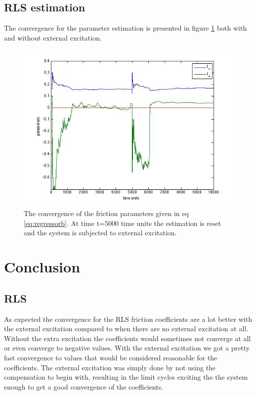 \documentclass[10pt,a4paper]{article}
\begin{document}
\subsection{RLS estimation}
The convergence for the parameter estimation is presented in figure \ref{fig:rlsconv} both with and without external excitation.
\begin{figure}[H]
\centering
\includegraphics[scale=0.7]{plots/rlsconvergence.jpg}
\caption{The convergence of the friction parameters given in eq \ref{eq:regressorb}. At time t=5000 time units the estimation is reset and the system is subjected to external excitation.}
\label{fig:rlsconv}

\end{figure}


\section{Conclusion}
\subsection{RLS}
As expected the convergence for the RLS friction coefficients are a lot better with the external excitation compared to when there are no external excitation at all. Without the extra excitation the coefficients would sometimes not converge at all or even converge to negative values. With the external excitation we got a pretty fast convergence to values that would be considered reasonable for the coefficients. The external excitation was simply done by not using the compensation to begin with, resulting in the limit cycles exciting the the system enough to get a good convergence of the coefficients.
\end{document}
